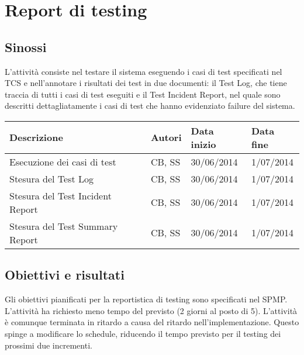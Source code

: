 \section{Report di testing}
\subsection{Sinossi}
L'attività consiste nel testare il sistema eseguendo i casi di test specificati nel TCS e nell'annotare i risultati dei test in due documenti: il Test Log, che tiene traccia di tutti i casi di test eseguiti e il Test Incident Report, nel quale sono descritti dettagliatamente i casi di test che hanno evidenziato failure del sistema.

\begin{table}[ht]
 \begin{tabular}{|p{6cm}|p{2cm}|p{2cm}|p{2cm}|}
    \hline
    \rowcolor{Gray}\textbf{Descrizione}			& \textbf{Autori}		& \textbf{Data inizio}			& \textbf{Data fine}	\\
    \hline
    Esecuzione dei casi di test				& CB, SS			& 30/06/2014				& 1/07/2014		\\
    \hline
    Stesura del Test Log				& CB, SS			& 30/06/2014				& 1/07/2014		\\
    \hline
    Stesura del Test Incident Report			& CB, SS			& 30/06/2014				& 1/07/2014		\\
    \hline
    Stesura del Test Summary Report			& CB, SS			& 30/06/2014				& 1/07/2014		\\
    \hline
 \end{tabular}
\end{table}

\subsection{Obiettivi e risultati}
Gli obiettivi pianificati per la reportistica di testing sono specificati nel SPMP. L'attività ha richiesto meno tempo del previsto (2 giorni al posto di 5). L'attività è comunque  terminata in ritardo a causa del ritardo nell'implementazione. Questo spinge a modificare lo schedule, riducendo il tempo previsto per il testing dei prossimi due incrementi. 

